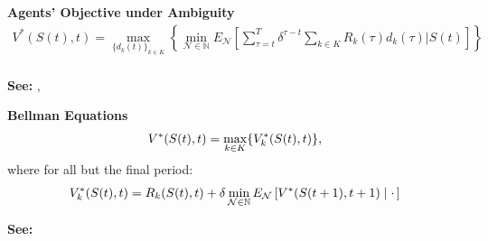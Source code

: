 \begin{frame}\vspace{0.75cm}
\textbf{Agents' Objective under Ambiguity}\vspace{0.3cm}
\begin{align*} 
V^*(S(t),t) = \max_{\{d_k(t)\}_{k \in K}} \left\{ \min_{\pmb{\mathcal{N}} \in \pmb{\mathbb{N}}}E_{\pmb{\mathcal{N}}}\left[ \sum_{\tau = t}^T \delta^{\tau - t} \sum_{k\in K}R_k(\tau)d_k(\tau)\Bigg| S(t)\right]\right\}\\
\end{align*}

\vspace{0.5cm}
\textbf{See:} \citet{Epstein.2003}, \citet{Hansen.2007}
\end{frame}
\begin{frame}
\textbf{Bellman Equations}\vspace{0.3cm}
\begin{align*}\small
V^*(S(t),t) = \max_{k \in K}\{V^*_k(S(t),t)\},
\end{align*}
where for all but the final period:
\begin{align*}
V^*_k(S(t),t) = R_k(S(t),t) + \delta \min_{\mathcal{N} \in \mathbb{N}}E_\mathcal{N}\left[V^*(S(t + 1), t + 1)\mid\cdot\thinspace\right] \end{align*}

\vspace{0.5cm}
\textbf{See:} \citet{Iyengar.2005}

\end{frame}
